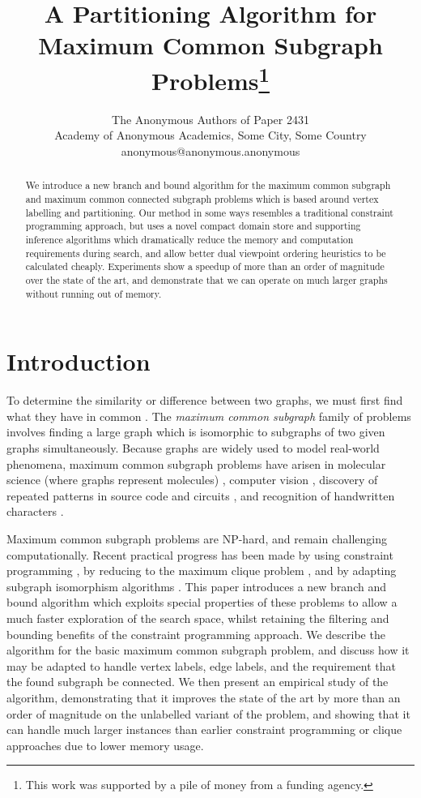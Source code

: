 \documentclass[letterpaper]{article}
\title{A Partitioning Algorithm for Maximum Common Subgraph Problems\thanks{This work
was supported by a pile of money from a funding agency.}}
\author{The Anonymous Authors of Paper 2431 \\
Academy of Anonymous Academics, Some City, Some Country \\
anonymous@anonymous.anonymous}
\newcommand{\citep}[1]{\cite{#1}}
\begin{document}
\maketitle

\begin{abstract}
    We introduce a new branch and bound algorithm for the maximum common
    subgraph and maximum common connected subgraph problems which is based
    around vertex labelling and partitioning. Our method in some ways resembles
    a traditional constraint programming approach, but uses a novel compact
    domain store and supporting inference algorithms which dramatically reduce
    the memory and computation requirements during search, and allow better
    dual viewpoint ordering heuristics to be calculated cheaply.  Experiments
    show a speedup of more than an order of magnitude over the state of the
    art, and demonstrate that we can operate on much larger graphs without
    running out of memory.
\end{abstract}

\section{Introduction}

To determine the similarity or difference between two graphs, we must first
find what they have in common
\citep{DBLP:journals/prl/Bunke97,DBLP:journals/prl/FernandezV01,KriegeThesis}.
The \emph{maximum common subgraph} family of problems involves finding a large
graph which is isomorphic to subgraphs of two given graphs simultaneously.
Because graphs are widely used to model real-world phenomena, maximum common
subgraph problems have arisen in molecular science (where graphs represent
molecules)
\citep{DBLP:journals/jcamd/RaymondW02a,Ehrlich:2011,DAM2014,Grindley1993707},
computer vision \cite{DBLP:journals/jair/CookH94}, discovery of repeated
patterns in source code \cite{DBLP:journals/tkde/DjokoCH97} and circuits
\cite{DBLP:journals/jair/CookH94}, and recognition of handwritten characters
\cite{SIWEILU1991617}.

Maximum common subgraph problems are NP-hard, and remain challenging
computationally. Recent practical progress has been made by using constraint
programming \citep{DBLP:conf/cp/NdiayeS11,DBLP:conf/cp/McCreeshNPS16}, by
reducing to the maximum clique problem
\citep{LeviG,DBLP:conf/cp/McCreeshNPS16}, and by adapting subgraph isomorphism
algorithms \citep{UpcomingAAAIPaper}. This paper introduces a new branch and
bound algorithm which exploits special properties of these problems to allow a
much faster exploration of the search space, whilst retaining the filtering and
bounding benefits of the constraint programming approach. We describe the
algorithm for the basic maximum common subgraph problem, and discuss how it may
be adapted to handle vertex labels, edge labels, and the requirement that the
found subgraph be connected. We then present an empirical study of the
algorithm, demonstrating that it improves the state of the art by more than an
order of magnitude on the unlabelled variant of the problem, and showing that
it can handle much larger instances than earlier constraint programming or
clique approaches due to lower memory usage.
\end{document}
